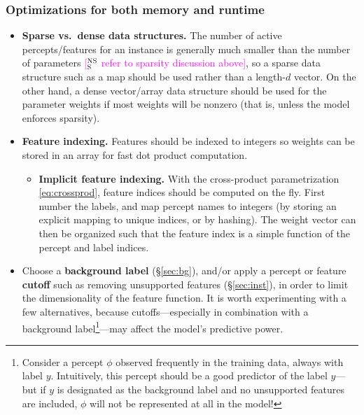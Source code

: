 \documentclass[11pt,letterpaper]{article}
\newcommand{\ensuretext}[1]{#1}
\newcommand{\nssmarker}{\ensuretext{\textcolor{magenta}{\ensuremath{^{\textsc{NS}}_{\textsc{S}}}}}}
\newcommand{\arkcomment}[3]{\ensuretext{\textcolor{#3}{[#1 #2]}}}
\newcommand{\nss}[1]{\arkcomment{\nssmarker}{#1}{magenta}}
\newcommand{\Sref}[1]{\S\ref{#1}}
\newcommand{\eref}[1]{\eqref{#1}}
\begin{document}
\subsubsection{Optimizations for both memory and runtime}

\begin{itemize}
\item \textbf{Sparse vs.~dense data structures.} 
The number of active percepts\slash features for an instance 
is generally much smaller than the number of parameters \nss{refer to sparsity discussion above}, 
so a sparse data structure such as a map should be used rather than a length-$d$ vector.
On the other hand, a dense vector/array data structure should be used for the parameter weights
if most weights will be nonzero (that is, unless the model enforces sparsity).

\item \textbf{Feature indexing.}
Features should be indexed to integers so weights can be stored in an array for fast dot product computation.
\begin{itemize}
\item \textbf{Implicit feature indexing.} 
With the cross-product parametrization \eref{eq:crossprod}, 
feature indices should be computed on the fly.
First number the labels, 
and map percept names to integers (by storing an explicit mapping to unique indices, or by hashing).
The weight vector can then be organized such that the feature index 
is a simple function of the percept and label indices.
\end{itemize}

\item Choose a \textbf{background label} (\Sref{sec:bg}), 
and\slash or apply a percept or feature \textbf{cutoff} 
such as removing unsupported features (\Sref{sec:inst}), 
in order to limit the dimensionality of the feature function.
It is worth experimenting with a few alternatives, because cutoffs---especially 
in combination with a background label\footnote{Consider a percept $\phi$ observed frequently in the training
data, always with label $y$. Intuitively, this percept should be a good predictor of the label $y$---but
if $y$ is designated as the background label and no unsupported features are included,
$\phi$ will not be represented at all in the model!}---may affect the model's predictive power.
\end{itemize}
\end{document}
